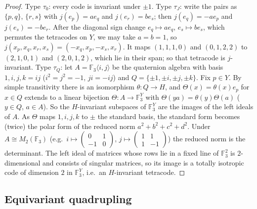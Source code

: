 \documentclass[11pt]{amsart}
\theoremstyle{definition}
\newcommand{\F}{\mathbb{F}_3}
\begin{document}
\begin{proof}
Type $\tau_0$: every code is invariant under $\pm1$. Type $\tau_J$: write the pairs as $\{p,q\}$,
$\{r,s\}$ with $j(e_p)=ae_q$ and $j(e_r)=be_s$; then $j(e_q)=-ae_p$ and $j(e_s)=-be_r$. After the
diagonal sign change $e_q\mapsto ae_q$, $e_s\mapsto be_s$, which permutes the tetracodes on $Y$, we may
take $a=b=1$, so $j(x_p,x_q,x_r,x_s)=(-x_q,x_p,-x_s,x_r)$. It maps $(1,1,1,0)$ and $(0,1,2,2)$ to
$(2,1,0,1)$ and $(2,0,1,2)$, which lie in their span; so that tetracode is $j$-invariant.
Type $\tau_Q$: let $A=\F\langle i,j\rangle$ be the quaternion algebra with basis $1,i,j,k=ij$
($i^2=j^2=-1$, $ji=-ij$) and $Q=\{\pm1,\pm i,\pm j,\pm k\}$. Fix $p\in Y$. By simple transitivity
there is an isomorphism $\theta\colon Q\to H$, and $\Theta(x)=\theta(x)e_p$ for $x\in Q$ extends to a
linear bijection $\Theta\colon A\to\F^Y$ with $\Theta(ya)=\theta(y)\Theta(a)$ ($y\in Q$, $a\in A$).
So the $H$-invariant subspaces of $\F^Y$ are the images of the left ideals of $A$. As $\Theta$ maps
$1,i,j,k$ to $\pm$ the standard basis, the standard form becomes (twice) the polar form of the reduced
norm $a^2+b^2+c^2+d^2$. Under $A\cong M_2(\F)$ (e.g.\ $i\mapsto\left(\begin{smallmatrix}0&1\\-1&0
\end{smallmatrix}\right)$, $j\mapsto\left(\begin{smallmatrix}1&1\\1&-1\end{smallmatrix}\right)$) the
reduced norm is the determinant. The left ideal of matrices whose rows lie in a fixed line of $\F^2$
is $2$-dimensional and consists of singular matrices, so its image is a totally isotropic code of
dimension $2$ in $\F^Y$, i.e.\ an $H$-invariant tetracode.
\end{proof}

\subsection{Equivariant quadrupling}
\end{document}
